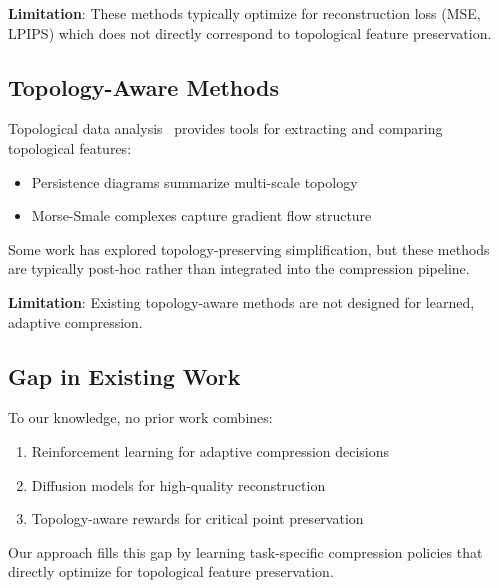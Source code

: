 \textbf{Limitation}: These methods typically optimize for reconstruction loss (MSE, LPIPS) which does not directly correspond to topological feature preservation.

\subsection{Topology-Aware Methods}

Topological data analysis~\cite{edelsbrunner2010} provides tools for extracting and comparing topological features:
\begin{itemize}
    \item Persistence diagrams summarize multi-scale topology
    \item Morse-Smale complexes capture gradient flow structure
\end{itemize}

Some work has explored topology-preserving simplification, but these methods are typically post-hoc rather than integrated into the compression pipeline.

\textbf{Limitation}: Existing topology-aware methods are not designed for learned, adaptive compression.

\subsection{Gap in Existing Work}

% 

To our knowledge, no prior work combines:
\begin{enumerate}
    \item Reinforcement learning for adaptive compression decisions
    \item Diffusion models for high-quality reconstruction
    \item Topology-aware rewards for critical point preservation
\end{enumerate}

Our approach fills this gap by learning task-specific compression policies that directly optimize for topological feature preservation.

